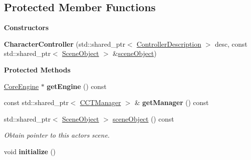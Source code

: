 \subsection*{Protected Member Functions}
\begin{Indent}\textbf{ Constructors}\par
\begin{DoxyCompactItemize}
\item 
\mbox{\label{classrev_1_1_character_controller_af6f4c692d2de7e386baa4dc6a1f2336f}} 
{\bfseries Character\+Controller} (std\+::shared\+\_\+ptr$<$ \mbox{\hyperlink{classrev_1_1_controller_description}{Controller\+Description}} $>$ desc, const std\+::shared\+\_\+ptr$<$ \mbox{\hyperlink{classrev_1_1_scene_object}{Scene\+Object}} $>$ \&\mbox{\hyperlink{classrev_1_1_character_controller_aafc51e1eb03ebd5f8f86d88b56067a64}{scene\+Object}})
\end{DoxyCompactItemize}
\end{Indent}
\begin{Indent}\textbf{ Protected Methods}\par
\begin{DoxyCompactItemize}
\item 
\mbox{\label{classrev_1_1_character_controller_a7132d905ecf8bc3addbc0fdb771779d2}} 
\mbox{\hyperlink{classrev_1_1_core_engine}{Core\+Engine}} $\ast$ {\bfseries get\+Engine} () const
\item 
\mbox{\label{classrev_1_1_character_controller_a13a351661fe323d245c7ae4e9d82b429}} 
const std\+::shared\+\_\+ptr$<$ \mbox{\hyperlink{classrev_1_1_c_c_t_manager}{C\+C\+T\+Manager}} $>$ \& {\bfseries get\+Manager} () const
\item 
\mbox{\label{classrev_1_1_character_controller_aafc51e1eb03ebd5f8f86d88b56067a64}} 
std\+::shared\+\_\+ptr$<$ \mbox{\hyperlink{classrev_1_1_scene_object}{Scene\+Object}} $>$ \mbox{\hyperlink{classrev_1_1_character_controller_aafc51e1eb03ebd5f8f86d88b56067a64}{scene\+Object}} () const
\begin{DoxyCompactList}\small\item\em Obtain pointer to this actor\textquotesingle{}s scene. \end{DoxyCompactList}\item 
\mbox{\label{classrev_1_1_character_controller_afe9727b269a9d719cd780b8c9c05dabe}} 
void {\bfseries initialize} ()
\end{DoxyCompactItemize}
\end{Indent}

